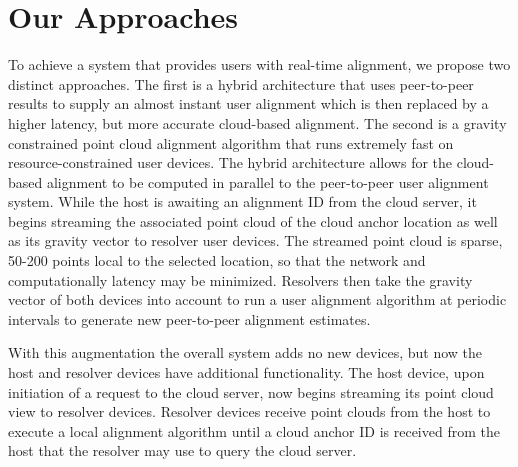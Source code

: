 \documentclass{vgtc}                          %
\begin{document}
\section{Our Approaches}
To achieve a system that provides users with real-time alignment, we propose two distinct approaches. The first is a hybrid architecture that uses peer-to-peer results to supply an almost instant user alignment which is then replaced by a higher latency, but
more accurate cloud-based alignment. The second is a gravity constrained  point cloud alignment algorithm that runs extremely fast on resource-constrained user devices.
The hybrid architecture allows for the cloud-based alignment to be computed in parallel to the peer-to-peer
user alignment system. While the host is awaiting an alignment ID from the cloud server, it begins streaming the associated point cloud of 
the cloud anchor location as well as its gravity vector to resolver user devices. The streamed point cloud is sparse, 50-200 points 
local to the selected location, so that the network and computationally latency may be minimized. Resolvers then take the gravity vector of both devices 
into account to run a user alignment algorithm at periodic intervals to generate new peer-to-peer alignment estimates. 

With this augmentation the overall system adds no new devices, but now the host and resolver devices have 
additional functionality. The host device, upon initiation of a request to the cloud server, now begins streaming its point cloud view to 
resolver devices. Resolver devices receive point clouds from the host to execute a local alignment algorithm until a cloud anchor ID is 
received from the host that the resolver may use to query the cloud server.




\end{document}
